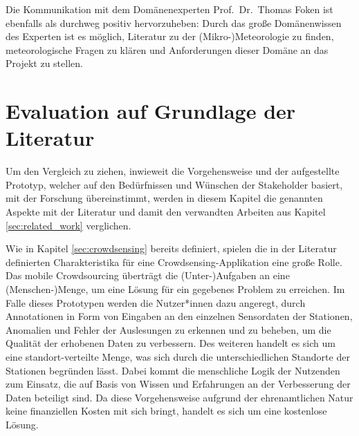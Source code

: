 Die Kommunikation mit dem Domänenexperten Prof.\ Dr.\ Thomas Foken ist ebenfalls als durchweg positiv hervorzuheben: Durch das große Domänenwissen des Experten ist es möglich, Literatur zu der (Mikro-)Meteorologie zu finden, meteorologische Fragen zu klären und Anforderungen dieser Domäne an das Projekt zu stellen.

\section{Evaluation auf Grundlage der Literatur}
\label{sec:evaluationliteratur}
Um den Vergleich zu ziehen, inwieweit die Vorgehensweise und der aufgestellte Prototyp, welcher auf den Bedürfnissen und Wünschen der Stakeholder basiert, mit der Forschung übereinstimmt, werden in diesem Kapitel die genannten Aspekte mit der Literatur und damit den verwandten Arbeiten aus Kapitel \ref{sec:related_work} verglichen.

Wie in Kapitel \ref{sec:crowdsensing} bereits definiert, spielen die in der Literatur definierten Charakteristika für eine Crowdsensing-Applikation eine große Rolle. Das mobile Crowdsourcing überträgt die (Unter-)Aufgaben an eine (Menschen-)Menge, um eine Lösung für ein gegebenes Problem zu erreichen. Im Falle dieses Prototypen werden die Nutzer*innen dazu angeregt, durch Annotationen in Form von Eingaben an den einzelnen Sensordaten der Stationen, Anomalien und Fehler der Auslesungen zu erkennen und zu beheben, um die Qualität der erhobenen Daten zu verbessern. Des weiteren handelt es sich um eine standort-verteilte Menge, was sich durch die unterschiedlichen Standorte der Stationen begründen lässt. Dabei kommt die menschliche Logik der Nutzenden zum Einsatz, die auf Basis von Wissen und Erfahrungen an der Verbesserung der Daten beteiligt sind. Da diese Vorgehensweise aufgrund der ehrenamtlichen Natur keine finanziellen Kosten mit sich bringt, handelt es sich um eine kostenlose Lösung.

